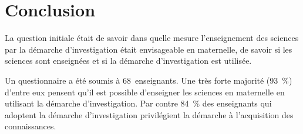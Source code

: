 \chapter{Conclusion}
La question initiale était de savoir dans quelle mesure l’enseignement des sciences par la démarche d’investigation était envisageable en maternelle, de savoir si les sciences sont enseignées et si la démarche d’investigation est utilisée.

Un questionnaire a été soumis à 68~enseignants. Une très forte majorité (93~\%) d’entre eux pensent qu’il est possible d’enseigner les sciences en maternelle en utilisant la démarche d’investigation. Par contre 84~\% des enseignants qui adoptent la démarche d’investigation privilégient la démarche à l’acquisition des connaissances.